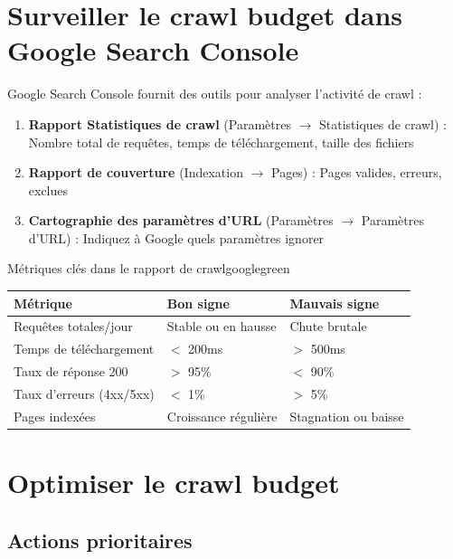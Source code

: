 \documentclass[12pt,a4paper,twoside]{report}
\begin{document}
\section{Surveiller le crawl budget dans Google Search Console}

Google Search Console fournit des outils pour analyser l'activité de crawl :

\begin{enumerate}
    \item \textbf{Rapport Statistiques de crawl} (Paramètres $\rightarrow$ Statistiques de crawl) : Nombre total de requêtes, temps de téléchargement, taille des fichiers
    \item \textbf{Rapport de couverture} (Indexation $\rightarrow$ Pages) : Pages valides, erreurs, exclues
    \item \textbf{Cartographie des paramètres d'URL} (Paramètres $\rightarrow$ Paramètres d'URL) : Indiquez à Google quels paramètres ignorer
\end{enumerate}

\begin{mybox}{Métriques clés dans le rapport de crawl}{googlegreen}
\begin{tabular}{|p{5cm}|p{4cm}|p{4cm}|}
\hline
\textbf{Métrique} & \textbf{Bon signe} & \textbf{Mauvais signe} \\
\hline
Requêtes totales/jour & Stable ou en hausse & Chute brutale \\
\hline
Temps de téléchargement & $<$ 200ms & $>$ 500ms \\
\hline
Taux de réponse 200 & $>$ 95\% & $<$ 90\% \\
\hline
Taux d'erreurs (4xx/5xx) & $<$ 1\% & $>$ 5\% \\
\hline
Pages indexées & Croissance régulière & Stagnation ou baisse \\
\hline
\end{tabular}
\end{mybox}

\section{Optimiser le crawl budget}

\subsection{Actions prioritaires}
\end{document}
